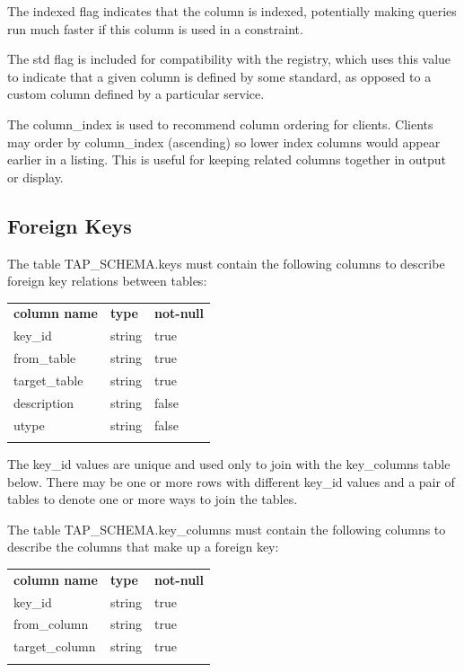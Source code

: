 \documentclass[11pt,letter]{ivoa}
\newcommand{\tapschema}{TAP\_SCHE\-MA}
\newcommand{\tapschema}{\mbox{%
  \relsize{-0.5}TAP\discretionary{-}{}{\kern-2pt\_}SCHEMA}}
\begin{document}
The indexed flag indicates that the column is indexed, potentially 
making queries run much faster if this column is used in a constraint. 

The std flag is included for compatibility with the registry, which uses this value 
to indicate that a given column is defined by some standard, as opposed to a 
custom column defined by a particular service.

The column\_index is used to recommend column ordering for clients. Clients 
may order by column\_index (ascending) so lower index columns would appear 
earlier in a listing. This is useful for keeping related columns together in 
output or display.

\subsection{Foreign Keys}
\label{sec:tap-schema-keys}
The table \tapschema.keys must contain the following columns to 
describe foreign key relations between tables:

\begin{inlinetable}
\begin{tabular}{l l l}
\sptablerule
\textbf{column name} & \textbf{type} & \textbf{not-null} \\
\sptablerule
key\_id & string & true \\
from\_table & string & true \\
target\_table & string & true \\
description & string & false \\
utype & string & false \\
\sptablerule
\end{tabular}
\end{inlinetable}

The key\_id values are unique and used only to join with the 
key\_columns table below. There may be 
one or more rows with different key\_id values and a pair 
of tables to denote one or more ways to join the tables.

The table \tapschema.key\_columns must contain the 
following columns to describe the columns that make up a foreign key:

\begin{inlinetable}
\begin{tabular}{l l l}
\sptablerule
\textbf{column name} & \textbf{type} & \textbf{not-null} \\
\sptablerule
key\_id & string & true \\
from\_column & string & true \\
target\_column & string & true \\
\sptablerule
\end{tabular}
\end{inlinetable}
\end{document}

